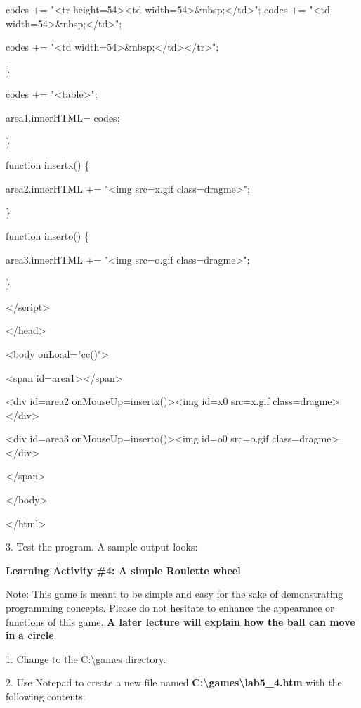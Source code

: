 \documentclass[
]{article}
\begin{document}
codes += "\textless tr height=54\textgreater\textless td
width=54\textgreater\&nbsp;\textless/td\textgreater"; codes +=
"\textless td width=54\textgreater\&nbsp;\textless/td\textgreater";

codes += "\textless td
width=54\textgreater\&nbsp;\textless/td\textgreater\textless/tr\textgreater";

\}

codes += "\textless table\textgreater";

area1.innerHTML= codes;

\}

function insertx() \{

area2.innerHTML += "\textless img src=x.gif
class=\textquotesingle dragme\textquotesingle\textgreater";

\}

function inserto() \{

area3.innerHTML += "\textless img src=o.gif
class=\textquotesingle dragme\textquotesingle\textgreater";

\}

\textless/script\textgreater{}

\textless/head\textgreater{}

\textless body onLoad="cc()"\textgreater{}

\textless span id=area1\textgreater\textless/span\textgreater{}

\textless div id=area2 onMouseUp=insertx()\textgreater\textless img
id=x0 src=x.gif class=dragme\textgreater\textless/div\textgreater{}

\textless div id=area3 onMouseUp=inserto()\textgreater\textless img
id=o0 src=o.gif class=dragme\textgreater\textless/div\textgreater{}

\textless/span\textgreater{}

\textless/body\textgreater{}

\textless/html\textgreater{}

3. Test the program. A sample output looks:

\textbf{Learning Activity \#4: A simple Roulette wheel}

Note: This game is meant to be simple and easy for the sake of
demonstrating programming concepts. Please do not hesitate to enhance
the appearance or functions of this game. \textbf{A later lecture will
explain how the ball can move in} \textbf{a circle}.

1. Change to the C:\textbackslash games directory.

2. Use Notepad to create a new file named
\textbf{C:\textbackslash games\textbackslash lab5\_4.htm} with the
following contents:
\end{document}
